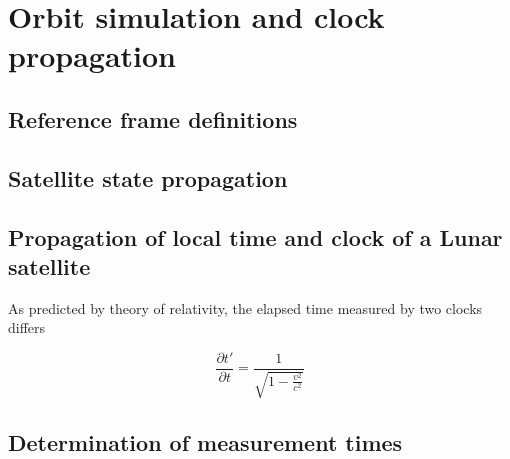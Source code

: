\chapter{Orbit simulation and clock propagation}

\section{Reference frame definitions}
\section{Satellite state propagation}
\section{Propagation of local time and clock of a Lunar satellite}
As predicted by theory of relativity, the elapsed time measured by two clocks differs 


\begin{equation}
	\frac{\partial t'}{\partial t} = \frac{1}{\sqrt{1-\frac{v^2}{c^2}}}
\label{eq:timedilation}
\end{equation}
	
\section{Determination of measurement times}